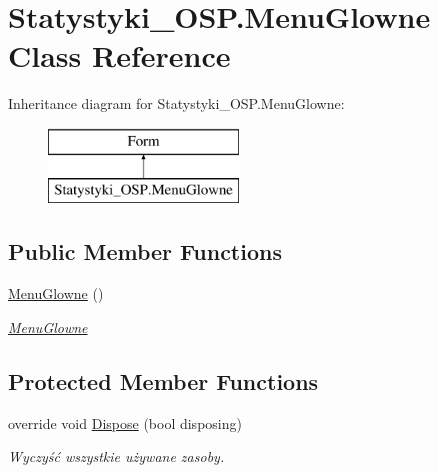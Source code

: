 \hypertarget{class_statystyki___o_s_p_1_1_menu_glowne}{}\section{Statystyki\+\_\+\+O\+S\+P.\+Menu\+Glowne Class Reference}
\label{class_statystyki___o_s_p_1_1_menu_glowne}
Inheritance diagram for Statystyki\+\_\+\+O\+S\+P.\+Menu\+Glowne\+:\begin{figure}[H]
\begin{center}
\leavevmode
\includegraphics[height=2.000000cm]{class_statystyki___o_s_p_1_1_menu_glowne}
\end{center}
\end{figure}
\subsection*{Public Member Functions}
\begin{DoxyCompactItemize}
\item 
\mbox{\hyperlink{class_statystyki___o_s_p_1_1_menu_glowne_ab8729000be3696d81762b1da2aa8dfb3}{Menu\+Glowne}} ()
\begin{DoxyCompactList}\small\item\em \mbox{\hyperlink{class_statystyki___o_s_p_1_1_menu_glowne}{Menu\+Glowne}} \end{DoxyCompactList}\end{DoxyCompactItemize}
\subsection*{Protected Member Functions}
\begin{DoxyCompactItemize}
\item 
override void \mbox{\hyperlink{class_statystyki___o_s_p_1_1_menu_glowne_afbebe7500d026a779c7502dde03b641c}{Dispose}} (bool disposing)
\begin{DoxyCompactList}\small\item\em Wyczyść wszystkie używane zasoby. \end{DoxyCompactList}\end{DoxyCompactItemize}
